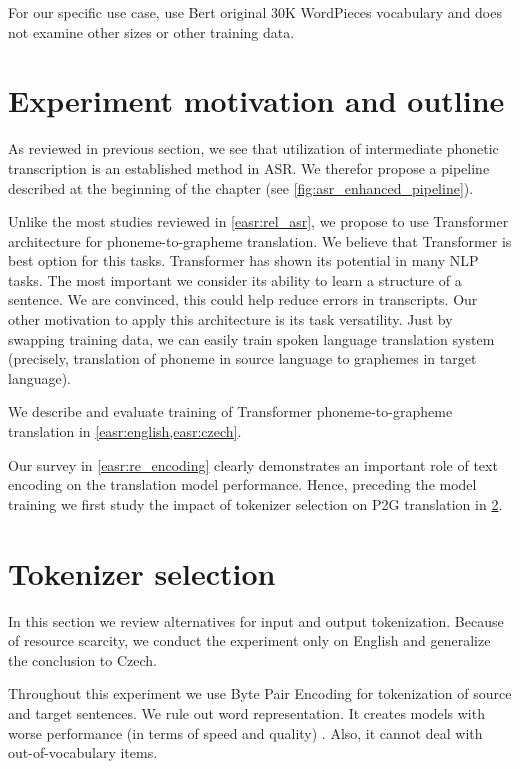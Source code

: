 For our specific use case,  use Bert  original 30K WordPieces vocabulary and does not examine other sizes or other training data.

\pagebreak
\section{Experiment motivation and outline}
\label{easr:eperiment}
As reviewed in previous section, we see that utilization of intermediate phonetic transcription is an established method in ASR. We therefor propose a pipeline described at the beginning of the chapter (see \cref{fig:asr_enhanced_pipeline}). 

Unlike the most studies reviewed in \cref{easr:rel_asr}, we propose to use Transformer architecture for phoneme-to-grapheme translation. We believe that Transformer is best option for this tasks. Transformer has shown its potential in many NLP tasks. The most important we consider its ability to learn a structure of a sentence. We are convinced, this could help reduce errors in transcripts. Our other motivation to apply this architecture is its task versatility. Just by swapping training data, we can easily train spoken language translation system (precisely, translation of phoneme in source language to graphemes in target language). 

We describe and evaluate training of Transformer phoneme-to-grapheme translation in \cref{easr:english,easr:czech}.

Our survey in \cref{easr:re_encoding} clearly demonstrates an important role of text encoding on the translation model performance. Hence, preceding the model training we first study the impact of tokenizer selection on P2G translation in \cref{easr:tokenizer}.


\section{Tokenizer selection}
\label{easr:tokenizer}

In this section we review alternatives for input and output tokenization. Because of resource scarcity, we conduct the experiment only on English and generalize the conclusion to Czech. 

Throughout this experiment we use Byte Pair Encoding for tokenization of source and target sentences. We rule out word representation. It creates models with worse performance (in terms of speed and quality) . Also, it cannot deal with out-of-vocabulary items.

